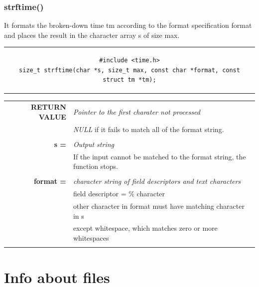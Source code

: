 \subsubsection{strftime()}
It formats the broken-down time tm according to the format specification format and places the result in the character array s of size max.
\begin{center}
\begin{tabular}{c}
\begin{lstlisting}[linewidth=410pt, basicstyle=\footnotesize\sffamily,]
#include <time.h>
size_t strftime(char *s, size_t max, const char *format, const struct tm *tm);
\end{lstlisting}
\end{tabular}
\end{center}

\begin{table}[H]
\centering\footnotesize
\begin{tabular}{rl}
\textbf{RETURN VALUE} & {\textit{Pointer to the first charater not processed}}\\
{} & {\textit{NULL} if it fails to match all of the format string.}\\
& \\
\textbf{s =} & {\textit{Output string}}\\
{}&{If the input cannot be matched to the format string, the function stops.}\\
& \\
\textbf{format =} & {\textit{character string of field descriptors and text characters}}\\
{}&{field descriptor = \% character}\\
{}&{other character in format must have matching character in s}\\
{}&{except whitespace, which matches zero or more whitespaces}\\
& \\
\end{tabular}
\end{table}

\section{Info about files}
